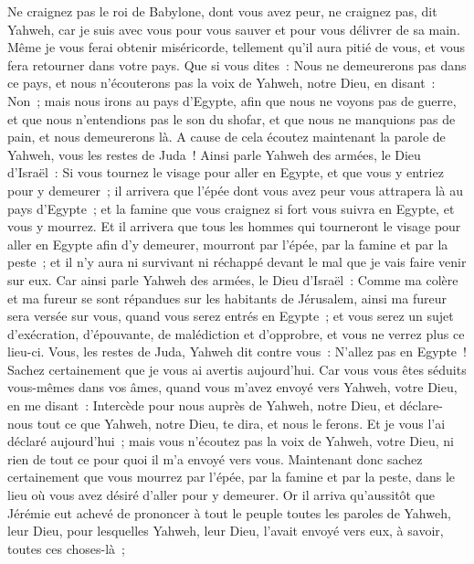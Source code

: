 \begin{multicols}{2}
Ne craignez pas le roi de Babylone, dont vous avez peur, ne craignez pas, dit Yahweh, car je suis avec vous pour vous sauver et pour vous délivrer de sa main.
Même je vous ferai obtenir miséricorde, tellement qu'il aura pitié de vous, et vous fera retourner dans votre pays.
Que si vous dites~: Nous ne demeurerons pas dans ce pays, et nous n'écouterons pas la voix de Yahweh, notre Dieu,
en disant~: Non~; mais nous irons au pays d'Egypte, afin que nous ne voyons pas de guerre, et que nous n'entendions pas le son du shofar, et que nous ne manquions pas de pain, et nous demeurerons là.
A cause de cela écoutez maintenant la parole de Yahweh, vous les restes de Juda~! Ainsi parle Yahweh des armées, le Dieu d'Israël~: Si vous tournez le visage pour aller en Egypte, et que vous y entriez pour y demeurer~;
il arrivera que l'épée dont vous avez peur vous attrapera là au pays d'Egypte~; et la famine que vous craignez si fort vous suivra en Egypte, et vous y mourrez.
Et il arrivera que tous les hommes qui tourneront le visage pour aller en Egypte afin d'y demeurer, mourront par l'épée, par la famine et par la peste~; et il n'y aura ni survivant ni réchappé devant le mal que je vais faire venir sur eux.
Car ainsi parle Yahweh des armées, le Dieu d'Israël~: Comme ma colère et ma fureur se sont répandues sur les habitants de Jérusalem, ainsi ma fureur sera versée sur vous, quand vous serez entrés en Egypte~; et vous serez un sujet d'exécration, d'épouvante, de malédiction et d'opprobre, et vous ne verrez plus ce lieu-ci.
Vous, les restes de Juda, Yahweh dit contre vous~: N'allez pas en Egypte~! Sachez certainement que je vous ai avertis aujourd'hui.
Car vous vous êtes séduits vous-mêmes dans vos âmes, quand vous m'avez envoyé vers Yahweh, votre Dieu, en me disant~: Intercède pour nous auprès de Yahweh, notre Dieu, et déclare-nous tout ce que Yahweh, notre Dieu, te dira, et nous le ferons.
Et je vous l'ai déclaré aujourd'hui~; mais vous n'écoutez pas la voix de Yahweh, votre Dieu, ni rien de tout ce pour quoi il m'a envoyé vers vous.
Maintenant donc sachez certainement que vous mourrez par l'épée, par la famine et par la peste, dans le lieu où vous avez désiré d'aller pour y demeurer.
\VerseOne{}Or il arriva qu'aussitôt que Jérémie eut achevé de prononcer à tout le peuple toutes les paroles de Yahweh, leur Dieu, pour lesquelles Yahweh, leur Dieu, l'avait envoyé vers eux, à savoir, toutes ces choses-là~;

\end{multicols}
